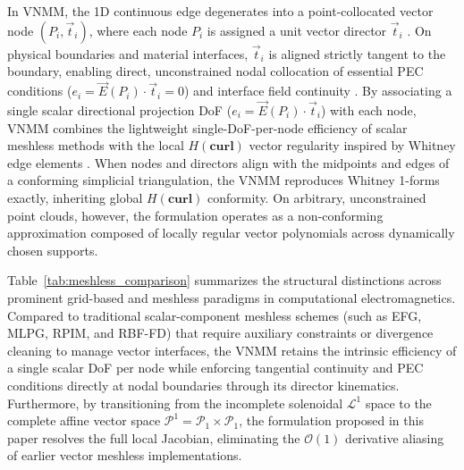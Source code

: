 \documentclass[preprint,12pt]{elsarticle}
\begin{document}
In VNMM, the 1D continuous edge degenerates into a point-collocated vector node $(P_i, \vec{t}_i)$, where each node $P_i$ is assigned a unit vector director $\vec{t}_i$ \cite{ortiz2021nodal, ortiz2023tese}. On physical boundaries and material interfaces, $\vec{t}_i$ is aligned strictly tangent to the boundary, enabling direct, unconstrained nodal collocation of essential PEC conditions ($e_i = \vec{E}(P_i) \cdot \vec{t}_i = 0$) and interface field continuity \cite{ortiz2021nodal, goncalves2025tese}. By associating a single scalar directional projection DoF ($e_i = \vec{E}(P_i) \cdot \vec{t}_i$) with each node, VNMM combines the lightweight single-DoF-per-node efficiency of scalar meshless methods with the local $H(\mathbf{curl})$ vector regularity inspired by Whitney edge elements \cite{ortiz2021nodal, goncalves2023vector, goncalves2025tese}. When nodes and directors align with the midpoints and edges of a conforming simplicial triangulation, the VNMM reproduces Whitney 1-forms exactly, inheriting global $H(\mathbf{curl})$ conformity. On arbitrary, unconstrained point clouds, however, the formulation operates as a non-conforming approximation composed of locally regular vector polynomials across dynamically chosen supports.

Table~\ref{tab:meshless_comparison} summarizes the structural distinctions across prominent grid-based and meshless paradigms in computational electromagnetics. Compared to traditional scalar-component meshless schemes (such as EFG, MLPG, RPIM, and RBF-FD) that require auxiliary constraints or divergence cleaning to manage vector interfaces, the VNMM retains the intrinsic efficiency of a single scalar DoF per node while enforcing tangential continuity and PEC conditions directly at nodal boundaries through its director kinematics. Furthermore, by transitioning from the incomplete solenoidal $\mathcal{L}^1$ space to the complete affine vector space $\mathcal{P}^1 = \mathcal{P}_1 \times \mathcal{P}_1$, the formulation proposed in this paper resolves the full local Jacobian, eliminating the $\mathcal{O}(1)$ derivative aliasing of earlier vector meshless implementations.
\end{document}
